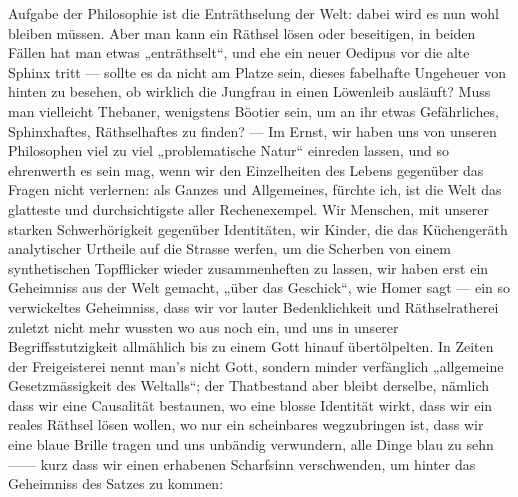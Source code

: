 Aufgabe der Philosophie ist die Enträthselung der Welt: dabei wird es nun wohl bleiben müssen. Aber man kann ein Räthsel lösen oder beseitigen, in beiden Fällen hat man etwas „enträthselt“, und ehe ein neuer Oedipus vor die alte Sphinx tritt — sollte es da nicht am Platze sein, dieses fabelhafte Ungeheuer von hinten zu besehen, ob wirklich die Jungfrau in einen Löwenleib ausläuft? Muss man vielleicht Thebaner, wenigstens Böotier sein, um an ihr etwas Gefährliches, Sphinxhaftes, Räthselhaftes zu finden? — Im Ernst, wir haben uns von unseren Philosophen viel zu viel „problematische Natur“ einreden lassen, und so ehrenwerth es sein mag, wenn wir den Einzelheiten des Lebens gegenüber das Fragen nicht verlernen: als Ganzes und Allgemeines, fürchte ich, ist die Welt das glatteste und durchsichtigste aller Rechenexempel. Wir Menschen, mit unserer starken Schwerhörigkeit gegenüber Identitäten, wir Kinder, die das Küchengeräth analytischer Urtheile auf die Strasse werfen, um die Scherben von einem synthetischen Topfflicker wieder zusammenheften zu lassen, wir haben erst ein Geheimniss aus der Welt gemacht, „über das Geschick“, wie Homer sagt — ein so verwickeltes Geheimniss, dass wir vor lauter Bedenklichkeit und Räthselratherei zuletzt nicht mehr wussten wo aus noch ein, und uns in unserer Begriffsstutzigkeit allmählich bis zu einem Gott hinauf übertölpelten. In Zeiten der Freigeisterei nennt man’s nicht Gott, sondern minder verfänglich „allgemeine Gesetzmässigkeit des Weltalls“; der Thatbestand aber bleibt derselbe, nämlich dass wir eine Causalität bestaunen, wo eine blosse Identität wirkt, dass wir ein reales Räthsel lösen wollen, wo nur ein scheinbares wegzubringen ist, dass wir eine blaue Brille tragen und uns unbändig verwundern, alle Dinge blau zu sehn —— kurz dass wir einen erhabenen Scharfsinn verschwenden, um hinter das Geheimniss des Satzes zu kommen:
\par

\begin{BookVerse}
\end{BookVerse}
